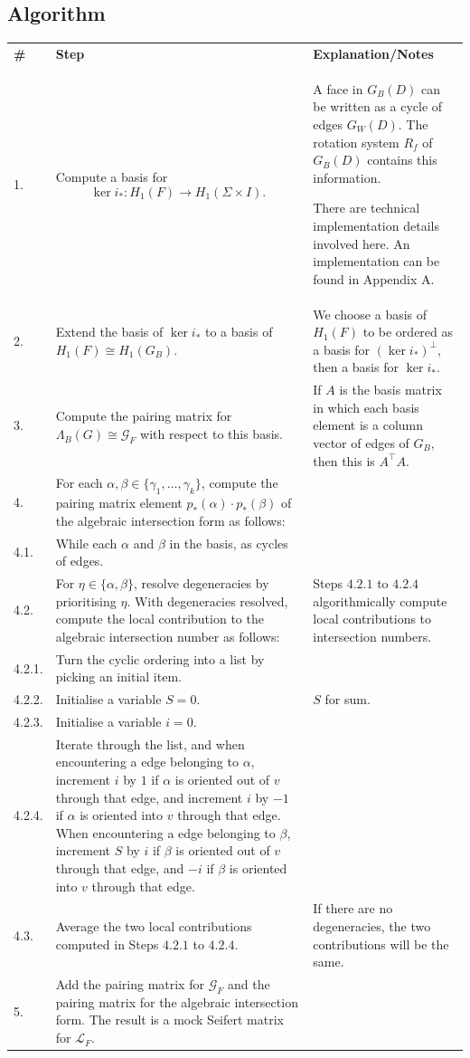 \documentclass[12pt]{report}
\theoremstyle{upright}
\begin{document}
\subsection*{Algorithm}
{\def\arraystretch{1.6}
\begin{longtable}{p{}p{}p{}}
	\textbf{\#} & \textbf{Step}
	& \textbf{Explanation/Notes}\\
	1.
	& Compute a basis for \[\ker i_{*}: H_{1}(F) \to H_{1}(\Sigma \times I).\]
	& A face in $G_{B}(D)$ can be written as a cycle of edges $G_{W}(D)$. The rotation system $R_{f}$ of $G_{B}(D)$ contains this information.
	
	There are technical implementation details involved here. An implementation can be found in Appendix A.\\
	2.
	& Extend the basis of $\ker i_{*}$ to a basis of ${H_{1}(F) \cong H_{1}(G_{B})}$.
	& We choose a basis of $H_{1}(F)$ to be ordered as a basis for $(\ker i_{*})^{\perp}$, then a basis for $\ker i_{*}$.\\
	3.
	& Compute the pairing matrix for $\Lambda_{B}(G) \cong \mathcal{G}_{F}$ with respect to this basis.
	& If $A$ is the basis matrix in which each basis element is a column vector of edges of $G_{B}$, then this is $A^{\top}A$.\\
	4.
	& For each $\alpha, \beta \in \{\gamma_{1}, \dots, \gamma_{k}\}$, compute the pairing matrix element $p_{*}(\alpha) \cdot p_{*}(\beta)$ of the algebraic intersection form as follows:
	& \\
	4.1. 
	& While each $\alpha$ and $\beta$ in the basis, as cycles of edges.
	& \\
	4.2. 
	& For $\eta \in \{\alpha, \beta\}$, resolve degeneracies by prioritising $\eta$. With degeneracies resolved, compute the local contribution to the algebraic intersection number as follows:
	& Steps $4.2.1$ to $4.2.4$ algorithmically compute local contributions to intersection numbers.\\
	4.2.1.
	& Turn the cyclic ordering into a list by picking an initial item.
	& \\
	4.2.2.
	& Initialise a variable $S = 0$.
	& $S$ for sum.\\
	4.2.3.
	& Initialise a variable $i = 0$.
	& \\
	4.2.4.
	& Iterate through the list, and when encountering a edge belonging to $\alpha$, increment $i$ by $1$ if $\alpha$ is oriented out of $v$ through that edge, and increment $i$ by $-1$ if $\alpha$ is oriented into $v$ through that edge. When encountering a edge belonging to $\beta$, increment $S$ by $i$ if $\beta$ is oriented out of $v$ through that edge, and $-i$ if $\beta$ is oriented into $v$ through that edge.
	& \\
	4.3.
	& Average the two local contributions computed in Steps $4.2.1$ to $4.2.4$.
	& If there are no degeneracies, the two contributions will be the same.\\
	5.
	& Add the pairing matrix for $\mathcal{G}_{F}$ and the pairing matrix for the algebraic intersection form. The result is a mock Seifert matrix for $\mathcal{L}_{F}$.
\end{longtable}
}
\end{document}
